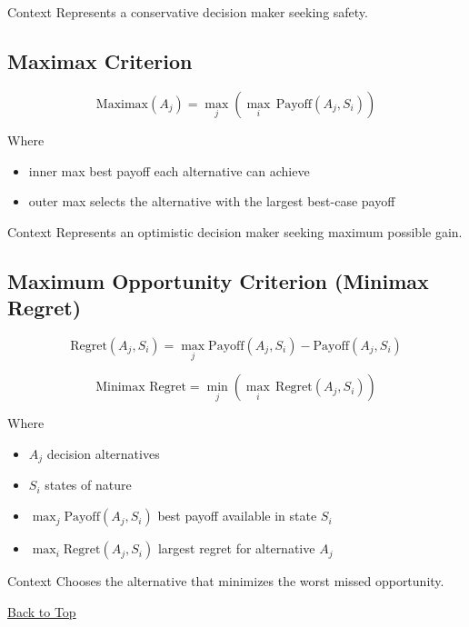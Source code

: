 	Context
	Represents a conservative decision maker seeking safety.
	
\subsection{Maximax Criterion}\label{formula-maximax}
	
	\[
	\text{Maximax}(A_j) = \max_j \left( \max_i \,\text{Payoff}(A_j,S_i) \right)
	\]
	
	Where
	\begin{itemize}
		\item inner max best payoff each alternative can achieve
		\item outer max selects the alternative with the largest best-case payoff
	\end{itemize}
	
Context
Represents an optimistic decision maker seeking maximum possible gain.

\subsection{Maximum Opportunity Criterion (Minimax Regret)}\label{formula-minimax-regret}

\[
\text{Regret}(A_j,S_i) = \max_j \text{Payoff}(A_j,S_i) - \text{Payoff}(A_j,S_i)
\]

\[
\text{Minimax Regret} = \min_j \left( \max_i \,\text{Regret}(A_j,S_i) \right)
\]

Where
\begin{itemize}
	\item \(A_j\) decision alternatives
	\item \(S_i\) states of nature
	\item \(\max_j \text{Payoff}(A_j,S_i)\) best payoff available in state \(S_i\)
	\item \(\max_i \text{Regret}(A_j,S_i)\) largest regret for alternative \(A_j\)
\end{itemize}

Context
Chooses the alternative that minimizes the worst missed opportunity.
	
	\vspace{6pt}
	\noindent\hyperref[table-of-contents]{Back to Top}
